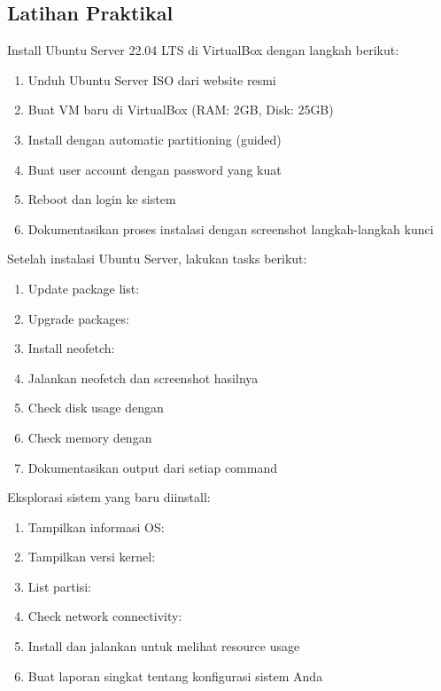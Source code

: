 \subsection{Latihan Praktikal}

\begin{exercisebox}[1.3]
Install Ubuntu Server 22.04 LTS di VirtualBox dengan langkah berikut:
\begin{enumerate}
    \item Unduh Ubuntu Server ISO dari website resmi
    \item Buat VM baru di VirtualBox (RAM: 2GB, Disk: 25GB)
    \item Install dengan automatic partitioning (guided)
    \item Buat user account dengan password yang kuat
    \item Reboot dan login ke sistem
    \item Dokumentasikan proses instalasi dengan screenshot langkah-langkah kunci
\end{enumerate}
\end{exercisebox}

\begin{exercisebox}[1.4]
Setelah instalasi Ubuntu Server, lakukan tasks berikut:
\begin{enumerate}
    \item Update package list: 
    \item Upgrade packages: 
    \item Install neofetch: 
    \item Jalankan neofetch dan screenshot hasilnya
    \item Check disk usage dengan 
    \item Check memory dengan 
    \item Dokumentasikan output dari setiap command
\end{enumerate}
\end{exercisebox}

\begin{exercisebox}[1.5]
Eksplorasi sistem yang baru diinstall:
\begin{enumerate}
    \item Tampilkan informasi OS: 
    \item Tampilkan versi kernel: 
    \item List partisi: 
    \item Check network connectivity: 
    \item Install dan jalankan  untuk melihat resource usage
    \item Buat laporan singkat tentang konfigurasi sistem Anda
\end{enumerate}
\end{exercisebox}

